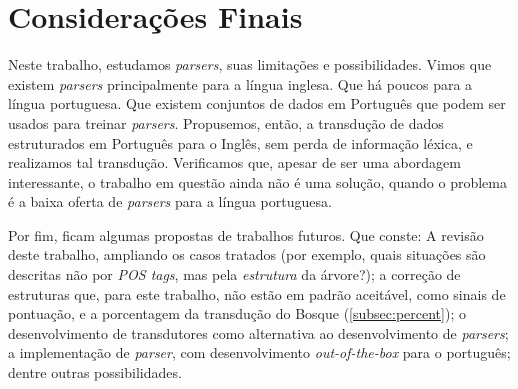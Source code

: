 \chapter{Considerações Finais}
\label{chap:considFinal}
Neste trabalho, estudamos \textit{parsers}, suas limitações e possibilidades. Vimos que existem \textit{parsers} principalmente para a língua inglesa. Que há poucos para a língua portuguesa. Que existem conjuntos de dados em Português que podem ser usados para treinar \textit{parsers}. Propusemos, então, a transdução de dados estruturados em Português para o Inglês, sem perda de informação léxica, e realizamos tal transdução. Verificamos que, apesar de ser uma abordagem interessante, o trabalho em questão ainda não é uma solução, quando o problema é a baixa oferta de \textit{parsers} para a língua portuguesa.

Por fim, ficam algumas propostas de trabalhos futuros. Que conste:
A revisão deste trabalho, ampliando os casos tratados (por exemplo, quais situações são descritas não por \textit{POS tags}, mas pela \textit{estrutura} da árvore?);
a correção de estruturas que, para este trabalho, não estão em padrão aceitável, como sinais de pontuação, e a porcentagem da transdução do Bosque (\ref{subsec:percent});
o desenvolvimento de transdutores como alternativa ao desenvolvimento de \textit{parsers};
a implementação de \textit{parser}, com desenvolvimento \textit{out-of-the-box} para o português; 
dentre outras possibilidades. 